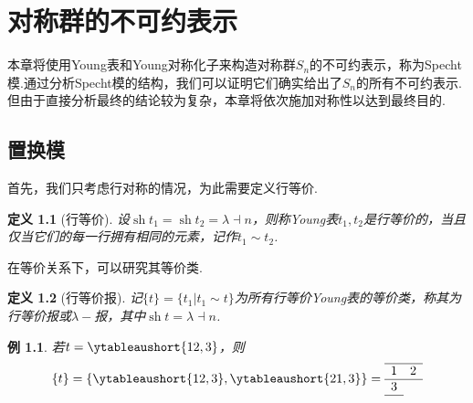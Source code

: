 \documentclass{sjtureport}
\newtheorem{definition}{定义}[chapter]
\newtheorem{example}{例}[chapter]
\DeclareMathOperator{\sh}{sh}
\begin{document}



\chapter{对称群的不可约表示}

本章将使用Young表和Young对称化子来构造对称群$S_n$的不可约表示，称为Specht模.通过分析Specht模的结构，我们可以证明它们确实给出了$S_n$的所有不可约表示.但由于直接分析最终的结论较为复杂，本章将依次施加对称性以达到最终目的.

\section{置换模}


首先，我们只考虑行对称的情况，为此需要定义行等价.

\begin{definition}[行等价]
    设$\sh t_1=\sh t_2=\lambda\dashv n$，则称Young表$t_1,t_2$是行等价的，当且仅当它们的每一行拥有相同的元素，记作$t_1\sim t_2$.
\end{definition}

在等价关系下，可以研究其等价类.
\begin{definition}[行等价报]
    记$\{t\}=\{t_1|t_1\sim t\}$为所有行等价Young表的等价类，称其为行等价报或$\lambda-\!$报，其中$\sh t=\lambda\dashv n$.
\end{definition}

\begin{example}
    若$t=\ytableaushort{12,3}$，则
    \begin{equation*}
        \{t\} = \qty{\ytableaushort{12,3},\ytableaushort{21,3}}=\begin{array}{ll}
            \hline
            1 & 2 \\
            \hline
            3 \\
            \cline{1-1}
        \end{array}
    \end{equation*}
\end{example}
\end{document}
